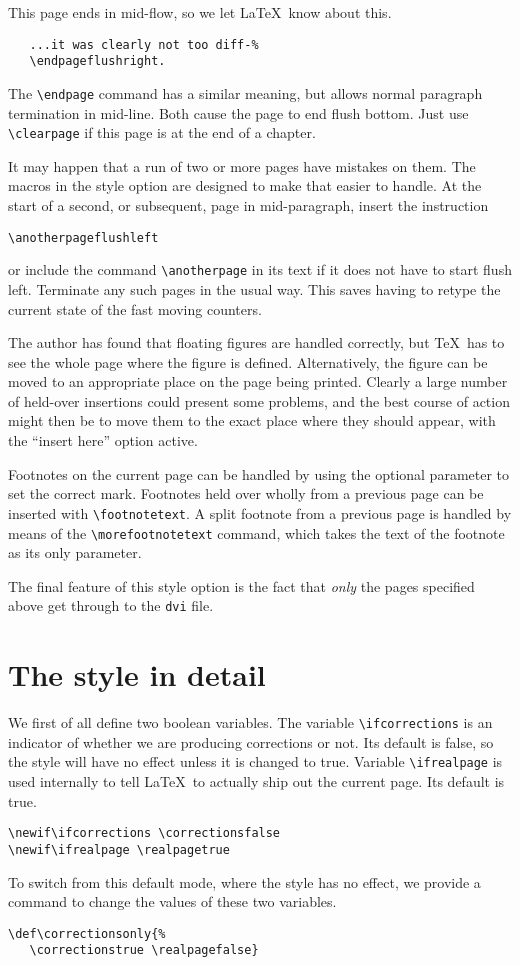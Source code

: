 This page ends in mid-flow, so we let \LaTeX\ know about this.
\begin{verbatim}
   ...it was clearly not too diff-%
   \endpageflushright.
\end{verbatim}
The \verb"\endpage" command has a similar meaning, but allows normal
paragraph termination in mid-line. Both cause the page to end flush bottom.
Just use \verb"\clearpage" if this page is at the end of a chapter.

It may happen that a run of two or more pages have mistakes on them. The macros
in the style option are designed to make that easier to handle. At the start of
a second, or subsequent, page in mid-paragraph, insert the instruction
\begin{verbatim}
\anotherpageflushleft
\end{verbatim}
or include the command \verb"\anotherpage" in its text if it does not have to
start flush left.
Terminate any such pages in the usual way.
This saves having to retype the
current state of the fast moving counters.

The author has found that floating figures are handled correctly, but \TeX\
has to see the whole page where the figure is defined. Alternatively,
the figure can be moved to an appropriate place on the page being printed.
Clearly a large number of held-over insertions could present some problems,
and the best course of action might then be to move them to the exact place
where they should appear, with the ``insert here'' option active.

Footnotes on the current page can be handled by using the optional
parameter to set the correct mark. Footnotes held over wholly from a
previous page can be inserted with \verb"\footnotetext".
A split footnote from a previous page is handled by means of the
\verb"\morefootnotetext" command, which takes the text of the footnote
as its only parameter.

The final feature of this style option is the fact that {\em only\/} the pages
specified above get through to the \verb"dvi" file.

\section{The style in detail}

We first of all define two boolean variables. The variable
\verb"\ifcorrections" is an indicator of
whether we are producing corrections or not. Its default is false, so the
style will have no effect unless it is changed to true.
Variable \verb"\ifrealpage" is used internally to tell \LaTeX\ to
actually ship out the current page. Its default is true.
\begin{verbatim}
\newif\ifcorrections \correctionsfalse
\newif\ifrealpage \realpagetrue
\end{verbatim}
To switch from this default mode, where the style has no effect, we provide
a command to change the values of these two variables.
\begin{verbatim}
\def\correctionsonly{%
   \correctionstrue \realpagefalse}
\end{verbatim}

